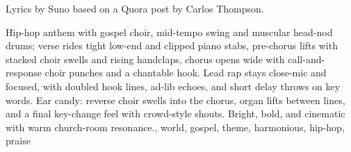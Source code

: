 

\begin{notes}
Lyrics by Suno based on a Quora post by Carlos Thompson.
\end{notes}
\begin{style}
Hip-hop anthem with gospel choir, mid-tempo swing and muscular head-nod drums; verse rides tight low-end and clipped piano stabs, pre-chorus lifts with stacked choir swells and rising handclaps, chorus opens wide with call-and-response choir punches and a chantable hook. %
Lead rap stays close-mic and focused, with doubled hook lines, ad-lib echoes, and short delay throws on key words. %
Ear candy: reverse choir swells into the chorus, organ lifts between lines, and a final key-change feel with crowd-style shouts. %
Bright, bold, and cinematic with warm church-room resonance., world, gospel, theme, harmonious, hip-hop, praise
\end{style}
